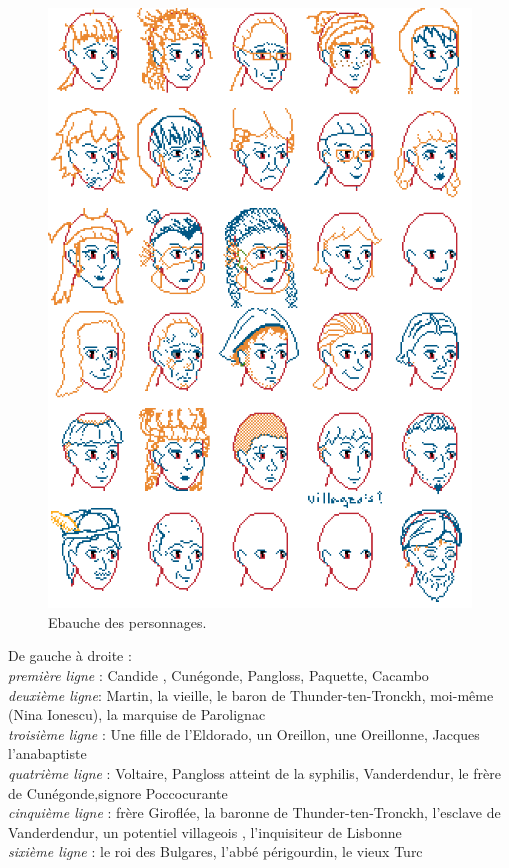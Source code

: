 \documentclass[11pt]{article}
\begin{document}
\begin{figure}[H]
\includegraphics[scale=0.7]{faces_Candide}
\centering
\caption{Ebauche des personnages.}
\end{figure}
De gauche à droite :\\\textit{première ligne} : Candide , Cunégonde, Pangloss, Paquette, Cacambo\\
\textit{deuxième ligne}: Martin, la vieille, le baron de Thunder-ten-Tronckh, moi-même (Nina Ionescu), la marquise de Parolignac\\
\textit{troisième ligne} :  Une fille de l'Eldorado, un Oreillon, une Oreillonne, Jacques l'anabaptiste\\
\textit{quatrième ligne} : Voltaire, Pangloss atteint de la syphilis, Vanderdendur, le frère de Cunégonde,signore Poccocurante\\
\textit{cinquième ligne} : frère Giroflée, la baronne de Thunder-ten-Tronckh, l'esclave de Vanderdendur, un potentiel villageois , l'inquisiteur de Lisbonne \\
\textit{sixième ligne} : le roi des Bulgares, l'abbé périgourdin, le vieux Turc\\
\end{document}
